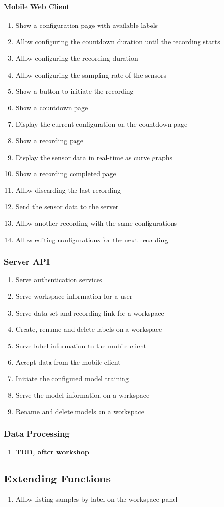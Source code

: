 \paragraph{Mobile Web Client}
\begin{enumerate}[resume*]
    \item Show a configuration page with available labels
    \item Allow configuring the countdown duration until the recording starts
    \item Allow configuring the recording duration
    \item Allow configuring the sampling rate of the sensors
    \item Show a button to initiate the recording
    \item Show a countdown page
    \item Display the current configuration on the countdown page
    \item Show a recording page
    \item Display the sensor data in real-time as curve graphs
    \item Show a recording completed page
    \item Allow discarding the last recording
    \item Send the sensor data to the server
    \item Allow another recording with the same configurations
    \item Allow editing configurations for the next recording
\end{enumerate}

\subsubsection{Server API}
\begin{enumerate}[resume*]
    \item Serve authentication services
    \item Serve workspace information for a user
    \item Serve data set and recording link for a workspace
    \item Create, rename and delete labels on a workspace
    \item Serve label information to the mobile client
    \item Accept data from the mobile client
    \item Initiate the configured model training
    \item Serve the model information on a workspace
    \item Rename and delete models on a workspace
\end{enumerate}

\subsubsection{Data Processing}
\begin{enumerate}[resume*]
    \item \textbf{TBD, after workshop}
\end{enumerate}

\subsection{Extending Functions}
\begin{enumerate}[resume*]
    \item Allow listing samples by label on the workspace panel
\end{enumerate}